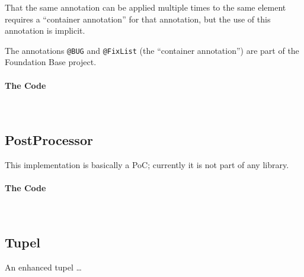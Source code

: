 That the same annotation can be applied multiple times to the same element requires a “container annotation” for that annotation\autocite{ORACLE_DOC_LANGUAGE_SPECIFICATION:RepeatableAnnotationInterfaces}, but the use of this annotation is implicit.

The annotations \lstinline|@BUG| and \lstinline|@FixList| (the “container annotation”) are part of the Foundation Base project\autocite{TQUADRAT_ORG_FOUNDATION_BASE, TQUADRAT_ORG_FOUNDATION_BUG, TQUADRAT_ORG_FOUNDATION_FIXLIST}.


\paragraph{The Code} \






\subsection{PostProcessor}\label{sec:PostProcessor}
This implementation is basically a PoC; currently it is not part of any library.


\paragraph{The Code} \


\subsection{Tupel}\label{sec:Tupel}

An enhanced tupel …

